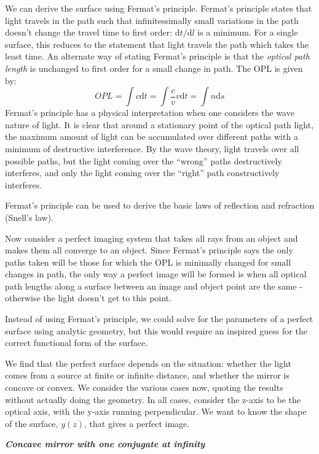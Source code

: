 \documentclass[12pt]{article}
\begin{document}
We can derive the surface using Fermat's principle. Fermat's principle
states that light travels in the path such that infinitessimally small
variations in the path doesn't change the travel time to first order:
$\textrm{d}t/\textrm{d}l$
is a minimum.
For a single surface, this reduces to
the statement that light travels the path which takes the least time.
An alternate way of stating Fermat's principle is that the \emph{optical path
length} is unchanged to first order for a small change in path. The OPL
is given by:
$$ OPL = \int{c\textrm{d}t} = \int{\frac{c}{v}v\textrm{d}t} = \int{n\textrm{d}s}$$
Fermat's principle has a physical interpretation when one considers the
wave nature of light. It is clear that around a stationary point of the
optical path light, the maximum amount of light can be accumulated over
different paths with a minimum of destructive interference. By the wave
theory, light travels over all possible paths, but the light coming over
the ``wrong'' paths destructively interferes, and only the light coming over
the ``right'' path constructively interferes.

Fermat's principle can be used to derive the basic laws of reflection
and refraction (Snell's law).

Now consider a perfect imaging system that takes all rays from an object
and makes them all converge to an object. Since Fermat's principle says
the only paths taken will be those for which the OPL is minimally changed
for small changes in path, the only way a perfect image will be formed is
when all optical path lengths along a surface between an image and object
point are the same - otherwise the light doesn't get to this point.

Instead of using Fermat's principle, we could solve for the parameters
of a perfect surface using analytic geometry, but this would require an
inspired guess for the correct functional form of the surface.

We find that the perfect surface depends on the situation: whether the
light comes from a source at finite or infinite distance, and whether
the mirror is concave or convex. We consider the various cases now,
quoting the results without actually doing the geometry. In all cases,
consider the z-axis to be the optical axis, with the y-axis running
perpendicular. We want to know the shape of the surface, $y(z)$, that gives
a perfect image.

\textbf{\emph{Concave mirror with one conjugate at infinity}}
\end{document}
